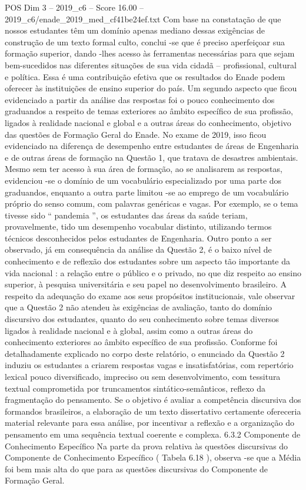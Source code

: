 \begin{textsample}{POS Dim 3 – 2019\_c6 – Score 16.00 – 2019\_c6/enade\_2019\_med\_cf41be24ef.txt}
Com base na constatação de que nossos estudantes têm um domínio apenas mediano dessas exigências de construção de um texto formal culto, conclui -se que é preciso aperfeiçoar sua formação superior, dando -lhes acesso às ferramentas necessárias para que sejam bem-sucedidos nas diferentes situações de sua vida cidadã – profissional, cultural e política.
Essa é uma contribuição efetiva que os resultados do Enade podem oferecer às instituições de ensino superior do país.
Um segundo aspecto que ficou evidenciado a partir da análise das respostas foi o pouco conhecimento dos graduandos a respeito de temas exteriores ao âmbito específico de sua profissão, ligados à realidade nacional e global e a outras áreas do conhecimento, objetivo das questões de Formação Geral do Enade.
No exame de 2019, isso ficou evidenciado na diferença de desempenho entre estudantes de áreas de Engenharia e de outras áreas de formação na Questão 1, que tratava de desastres ambientais.
Mesmo sem ter acesso à sua área de formação, ao se analisarem as respostas, evidenciou -se o domínio de um vocabulário especializado por uma parte dos graduandos, enquanto a outra parte limitou -se ao emprego de um vocabulário próprio do senso comum, com palavras genéricas e vagas.
Por exemplo, se o tema tivesse sido “ pandemia ”, os estudantes das áreas da saúde teriam, provavelmente, tido um desempenho vocabular distinto, utilizando termos técnicos desconhecidos pelos estudantes de Engenharia.
Outro ponto a ser observado, já em consequência da análise da Questão 2, é o baixo nível de conhecimento e de reflexão dos estudantes sobre um aspecto tão importante da vida nacional : a relação entre o público e o privado, no que diz respeito ao ensino superior, à pesquisa universitária e seu papel no desenvolvimento brasileiro.
A respeito da adequação do exame aos seus propósitos institucionais, vale observar que a Questão 2 não atendeu às exigências de avaliação, tanto do domínio discursivo dos estudantes, quanto do seu conhecimento sobre temas diversos ligados à realidade nacional e à global, assim como a outras áreas do conhecimento exteriores ao âmbito específico de sua profissão.
Conforme foi detalhadamente explicado no corpo deste relatório, o enunciado da Questão 2 induziu os estudantes a criarem respostas vagas e insatisfatórias, com repertório lexical pouco diversificado, impreciso ou sem desenvolvimento, com tessitura textual comprometida por truncamentos sintático-semânticos, reflexo da fragmentação do pensamento.
Se o objetivo é avaliar a competência discursiva dos formandos brasileiros, a elaboração de um texto dissertativo certamente ofereceria material relevante para essa análise, por incentivar a reflexão e a organização do pensamento em uma sequência textual coerente e complexa. 6.3.2 Componente de Conhecimento Específico Na parte da prova relativa às questões discursivas do Componente de Conhecimento Específico ( Tabela 6.18 ), observa -se que a Média foi bem mais alta do que para as questões discursivas do Componente de Formação Geral.

\end{textsample}
